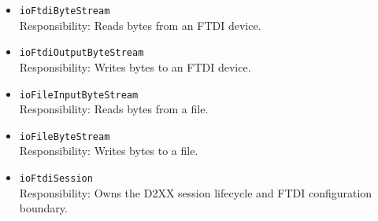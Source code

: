 \begin{itemize}
    \item \texttt{ioFtdiByteStream} \\
    Responsibility: Reads bytes from an FTDI device.

    \item \texttt{ioFtdiOutputByteStream} \\
    Responsibility: Writes bytes to an FTDI device.

    \item \texttt{ioFileInputByteStream} \\
    Responsibility: Reads bytes from a file.

    \item \texttt{ioFileByteStream} \\
    Responsibility: Writes bytes to a file.

    \item \texttt{ioFtdiSession} \\
    Responsibility: Owns the D2XX session lifecycle and FTDI configuration boundary.
\end{itemize}


